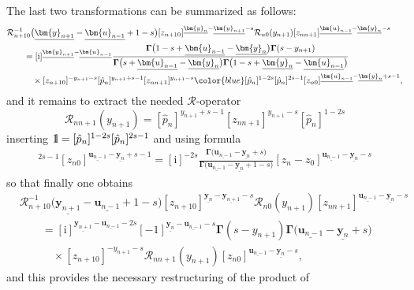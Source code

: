 \documentclass[pdftex]{sigma}
\newcommand{\blue}{\color{blue}}
\renewcommand{\imath}{\mathrm{i}}
\newcommand{\II}{\hbox{{1}\kern-.25em\hbox{l}}}
\numberwithin{equation}{section}
\begin{document}
The last two transformations can be summarized as follows:
\begin{align*}
&
\mathcal{R}^{-1}_{n+1 0}
\bigl(\underline{\bm{y}_{n+1}}-\underline{\bm{u}_{n-1}}+1-s\bigr)
[z_{n+1 0}]^{\underline{\bm{y}_{n}}-\underline{\bm{y}_{n+1}}-s}
\mathcal{R}_{n 0}(y_{n+1})
[z_{n n+1}]^{\underline{\bm{u}_{n-1}}-\underline{\bm{y}_{n}}-s} \\
& \qquad =
[\imath]^{\underline{\bm{y}_{n+1}}-
\underline{\bm{u}_{n-1}}}
\frac{\mathbf{\Gamma}\bigl(1-s+\underline{\bm{u}_{n-1}}-
\underline{\bm{y}_{n}}\bigr) \mathbf{\Gamma}(s-y_{n+1})}
{\mathbf{\Gamma}\bigl(s+\underline{\bm{u}_{n-1}}-
\underline{\bm{y}_{n}}\bigr)\mathbf{\Gamma}\bigl(1-s+\underline{\bm{y}_{n}}-
\underline{\bm{u}_{n-1}}\bigr)} \\
& \qquad\quad \times
[z_{n+1 0}]^{-y_{n+1}-s}
[\hat{p}_n]^{y_{n+1}+s-1} [z_{n n+1}]^{y_{n+1}-s}
{\blue [\hat{p}_n]^{1-2s} [\hat{p}_n]^{2s-1}}
[z_{n 0}]^{\underline{\bm{u}_{n-1}}-
\underline{\bm{y}_{n}}+s-1} ,
\end{align*}
and it remains to extract the needed $\mathcal{R}$-operator
\[
\mathcal{R}_{n n+1}(y_{n+1}) = [\hat{p}_n]^{y_{n+1}+s-1}
[z_{n n+1}]^{y_{n+1}-s} [\hat{p}_n]^{1-2s}
\]
inserting $\II = [\hat{p}_n]^{1-2s} [\hat{p}_n]^{2s-1}$ and using formula
\begin{align*}
[\hat{p}_n]^{2s-1}
[z_{n 0}]^{\underline{\bm{u}_{n-1}}-
\underline{\bm{y}_{n}}+s-1} =
[\imath]^{-2s}
\frac{\mathbf{\Gamma}\bigl(\underline{\bm{u}_{n-1}}-
\underline{\bm{y}_{n}}+s\bigr)}
{\mathbf{\Gamma}\bigl(\underline{\bm{u}_{n-1}}-
\underline{\bm{y}_{n}}+1-s\bigr)}
[z_n-z_0]^{\underline{\bm{u}_{n-1}}-
\underline{\bm{y}_{n}}-s}
\end{align*}
so that finally one obtains
\begin{align*}
&
\mathcal{R}^{-1}_{n+1 0}
\bigl(\underline{\bm{y}_{n+1}}-\underline{\bm{u}_{n-1}}+1-s\bigr)
[z_{n+1 0}]^{\underline{\bm{y}_{n}}-\underline{\bm{y}_{n+1}}-s}
\mathcal{R}_{n 0}(y_{n+1})
[z_{n n+1}]^{\underline{\bm{u}_{n-1}}-\underline{\bm{y}_{n}}-s} \\
& \qquad =
 [\imath]^{\underline{\bm{y}_{n+1}}-\underline{\bm{u}_{n-1}}-2s}
[-1]^{\underline{\bm{y}_{n}}-\underline{\bm{u}_{n-1}}-s}
\mathbf{\Gamma}(s-y_{n+1})
\mathbf{\Gamma}\bigl(\underline{\bm{u}_{n-1}}-\underline{\bm{y}_{n}}+s\bigr) \\
& \qquad\quad \times
[z_{n+1 0}]^{-y_{n+1}-s} \mathcal{R}_{n n+1}(y_{n+1})
[z_{n 0}]^{\underline{\bm{u}_{n-1}}-
\underline{\bm{y}_{n}}-s} ,
\end{align*}
and this provides the necessary restructuring of the product of
\end{document}
